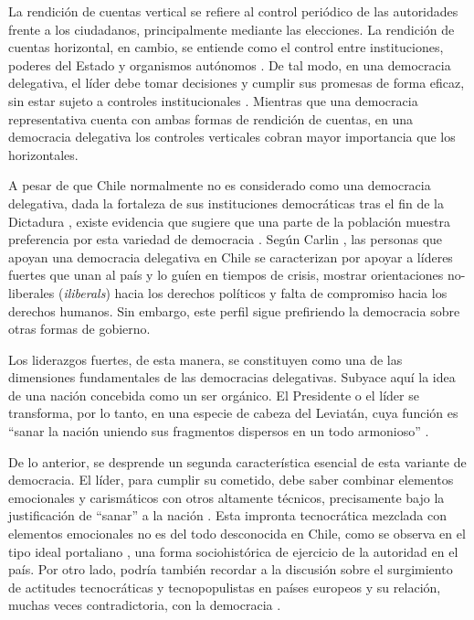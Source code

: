 \documentclass[12pt,twoside]{templates/facsothesis}
\begin{document}
La rendición de cuentas vertical se refiere al control periódico de las autoridades frente a los ciudadanos, principalmente mediante las elecciones. La rendición de cuentas horizontal, en cambio, se entiende como el control entre instituciones, poderes del Estado y organismos autónomos \citep{odonnell1994}. De tal modo, en una democracia delegativa, el líder debe tomar decisiones y cumplir sus promesas de forma eficaz, sin estar sujeto a controles institucionales \citep{toppi2018}. Mientras que una democracia representativa cuenta con ambas formas de rendición de cuentas, en una democracia delegativa los controles verticales cobran mayor importancia que los horizontales.

A pesar de que Chile normalmente no es considerado como una democracia delegativa, dada la fortaleza de sus instituciones democráticas tras el fin de la Dictadura \citep{carlin2018, odonnell1994}, existe evidencia que sugiere que una parte de la población muestra preferencia por esta variedad de democracia \citep{carlin2011, carlin2018}. Según Carlin \citeyearpar{carlin2018}, las personas que apoyan una democracia delegativa en Chile se caracterizan por apoyar a líderes fuertes que unan al país y lo guíen en tiempos de crisis, mostrar orientaciones no-liberales (\emph{iliberals}) hacia los derechos políticos y falta de compromiso hacia los derechos humanos. Sin embargo, este perfil sigue prefiriendo la democracia sobre otras formas de gobierno.

Los liderazgos fuertes, de esta manera, se constituyen como una de las dimensiones fundamentales de las democracias delegativas. Subyace aquí la idea de una nación concebida como un ser orgánico. El Presidente o el líder se transforma, por lo tanto, en una especie de cabeza del Leviatán, cuya función es ``sanar la nación uniendo sus fragmentos dispersos en un todo armonioso'' \citep[p.60]{odonnell1994}.

De lo anterior, se desprende un segunda característica esencial de esta variante de democracia. El líder, para cumplir su cometido, debe saber combinar elementos emocionales y carismáticos con otros altamente técnicos, precisamente bajo la justificación de ``sanar'' a la nación \citep{odonnell1994}. Esta impronta tecnocrática mezclada con elementos emocionales no es del todo desconocida en Chile, como se observa en el tipo ideal portaliano \citep{araujo2013}, una forma sociohistórica de ejercicio de la autoridad en el país. Por otro lado, podría también recordar a la discusión sobre el surgimiento de actitudes tecnocráticas y tecnopopulistas en países europeos y su relación, muchas veces contradictoria, con la democracia \citep{chiru2022, ganuza2020, pilet2023}.
\end{document}
